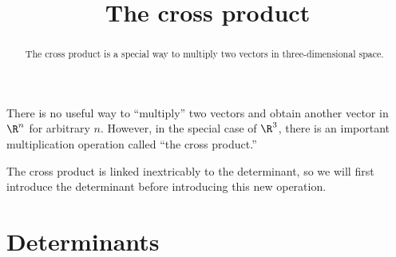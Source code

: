 \documentclass{ximera}
\title[Dig-In:]{The cross product}
\begin{document}
\begin{abstract}
  The cross product is a special way to multiply two vectors in
  three-dimensional space.
\end{abstract}
\maketitle

There is no useful way to ``multiply'' two vectors and obtain another
vector in $\R^n$ for arbitrary $n$. However, in the special case of
$\R^3$, there is an important multiplication operation called ``the
cross product.''

The cross product is linked inextricably to the determinant, so we
will first introduce the determinant before introducing this new
operation. 

\section{Determinants}
\end{document}
